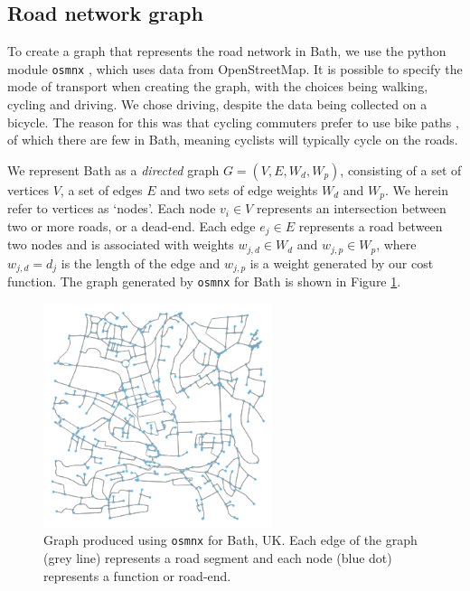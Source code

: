 \documentclass[11pt,twosided,a4paper]{report}
\begin{document}

\subsection{Road network graph} \label{network_graph}

To create a graph that represents the road network in Bath, we use the python module \texttt{osmnx} \citep{boeing2017osmnx}, which uses data from OpenStreetMap. It is possible to specify the mode of transport when creating the graph, with the choices being walking, cycling and driving. We chose driving, despite the data being collected on a bicycle. The reason for this was that cycling commuters prefer to use bike paths \citep{broach2012wherecyclistsride, skov_petersen2018cyclingpreferences}, of which there are few in Bath, meaning cyclists will typically cycle on the roads.

We represent Bath as a \textit{directed} graph $G = (V, E, W_d, W_p)$, consisting of a set of vertices $V$, a set of edges $E$ and two sets of edge weights $W_d$ and $W_p$. We herein refer to vertices as `nodes'. Each node $v_i \in V$ represents an intersection between two or more roads, or a dead-end. Each edge $e_j \in E$ represents a road between two nodes and is associated with weights $w_{j, d} \in W_d$ and $w_{j, p} \in W_p$, where $w_{j, d} = d_j$ is the length of the edge and $w_{j, p}$ is a weight generated by our cost function. The graph generated by \texttt{osmnx} for Bath is shown in Figure \ref{fig:network_graph}.

\begin{figure}[!tb]
\centering
\includegraphics[width=0.6\textwidth]{images/network_graph}
\caption[\texttt{osmnx} graph for Bath.]{Graph produced using \texttt{osmnx} for Bath, UK. Each edge of the graph (grey line) represents a road segment and each node (blue dot) represents a function or road-end.}
\label{fig:network_graph}
\end{figure}
\end{document}
